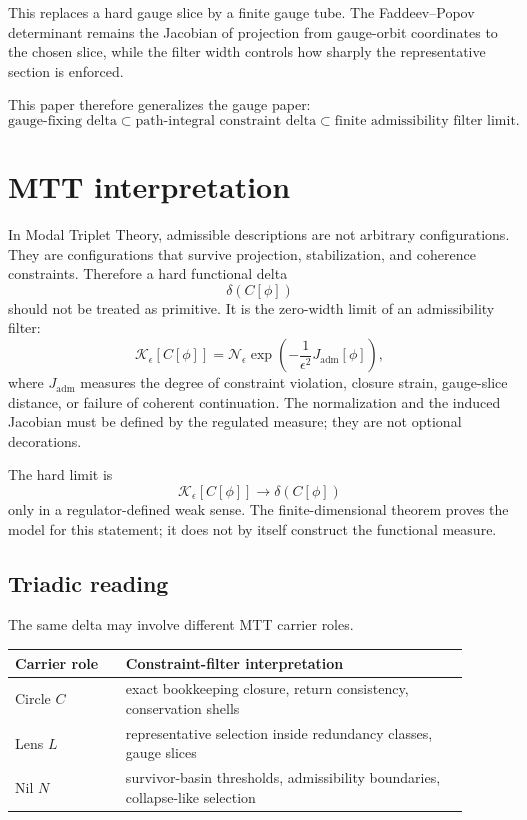 \documentclass[11pt]{article}
\begin{document}
This replaces a hard gauge slice by a finite gauge tube.  The Faddeev--Popov determinant
remains the Jacobian of projection from gauge-orbit coordinates to the chosen slice, while
the filter width controls how sharply the representative section is enforced.

This paper therefore generalizes the gauge paper:
\[
\text{gauge-fixing delta}
\subset
\text{path-integral constraint delta}
\subset
\text{finite admissibility filter limit}.
\]

\section{MTT interpretation}

In Modal Triplet Theory, admissible descriptions are not arbitrary configurations.  They are
configurations that survive projection, stabilization, and coherence constraints.  Therefore
a hard functional delta
\[
\delta(C[\phi])
\]
should not be treated as primitive.  It is the zero-width limit of an admissibility filter:
\[
\mathcal K_{\epsilon}[C[\phi]]
=
\mathcal N_\epsilon
\exp\!\left(-\frac{1}{\epsilon^2}J_{\mathrm{adm}}[\phi]\right),
\]
where \(J_{\mathrm{adm}}\) measures the degree of constraint violation, closure strain, gauge-slice
distance, or failure of coherent continuation. The normalization and the induced Jacobian
must be defined by the regulated measure; they are not optional decorations.

The hard limit is
\[
\mathcal K_\epsilon[C[\phi]]
\longrightarrow
\delta(C[\phi])
\]
only in a regulator-defined weak sense. The finite-dimensional theorem proves the model for
this statement; it does not by itself construct the functional measure.

\subsection{Triadic reading}

The same delta may involve different MTT carrier roles.

\begin{center}
\begin{tabular}{p{0.22\linewidth}p{0.68\linewidth}}
\toprule
Carrier role & Constraint-filter interpretation \\
\midrule
Circle \(C\) & exact bookkeeping closure, return consistency, conservation shells \\
Lens \(L\) & representative selection inside redundancy classes, gauge slices \\
Nil \(N\) & survivor-basin thresholds, admissibility boundaries, collapse-like selection \\
\bottomrule
\end{tabular}
\end{center}
\end{document}
